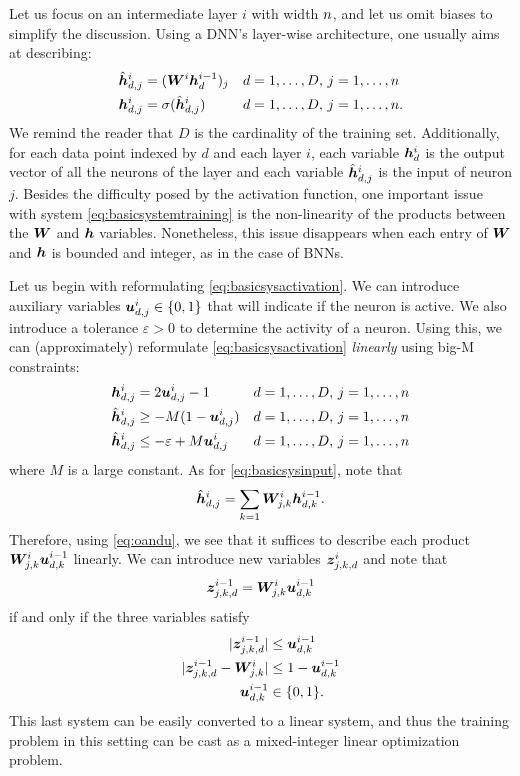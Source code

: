 Let us focus on an intermediate layer $i$ with width $n$, and let us omit biases to simplify the discussion. Using a DNN's layer-wise architecture, one usually aims at describing:
%
\begin{subequations} \label{eq:basicsystemtraining}
\begin{align}
    \hat{{\bm{h}}}^i_{d,j} & = ({\bm{W}}^{i} {\bm{h}}^{i-1}_d)_j  && d=1,\ldots,D,\, j=1,\ldots,n \label{eq:basicsysinput}\\
    {\bm{h}}^{i}_{d,j} & = \sigma(\hat{{\bm{h}}}^i_{d,j}) && d=1,\ldots,D,\, j=1,\ldots,n. \label{eq:basicsysactivation}
\end{align}
\end{subequations}
%
We remind the reader that $D$ is the cardinality of the training set.  Additionally, for each data point indexed by $d$ and each layer $i$, each variable ${\bm{h}}_{d}^{i}$ is the output vector of all the neurons of the layer and each variable $\hat{{\bm{h}}}_{d,j}^i$ is the input of neuron $j$.
%
Besides the difficulty posed by the activation function, one important issue with system \eqref{eq:basicsystemtraining} is the non-linearity of the products between the ${\bm{W}}$ and ${\bm{h}}$ variables. Nonetheless, this issue disappears when each entry of ${\bm{W}}$ and ${\bm{h}}$ is bounded and integer, as in the case of BNNs. 

Let us begin with reformulating \eqref{eq:basicsysactivation}. We can introduce auxiliary variables ${\bm{u}}_{d,j}^i\in \{0,1\}$ that will indicate if the neuron is active. We also introduce a tolerance $\varepsilon > 0$ to determine the activity of a neuron. Using this, we can (approximately) reformulate \eqref{eq:basicsysactivation} \emph{linearly} using big-M constraints:
%
\begin{subequations}\label{eq:activationreform}
\begin{align}
    {\bm{h}}^{i}_{d,j} & = 2{\bm{u}}_{d,j}^i -1     && d=1,\ldots,D,\, j=1,\ldots,n \label{eq:oandu}\\
    \hat{{\bm{h}}}^i_{d,j} & \geq -M (1-{\bm{u}}_{d,j}^i) && d=1,\ldots,D,\, j=1,\ldots,n \\
     \hat{{\bm{h}}}^i_{d,j} & \leq -\varepsilon + M {\bm{u}}_{d,j}^i && d=1,\ldots,D,\, j=1,\ldots,n 
\end{align}
\end{subequations}
%
where $M$ is a large constant. 
%
As for \eqref{eq:basicsysinput}, note that 
%
\[ \hat{{\bm{h}}}^i_{d,j} = \sum_{k=1}{\bm{W}}^{i}_{j,k} {\bm{h}}^{i-1}_{d,k}. \]
%
Therefore, using \eqref{eq:oandu}, we see that it suffices to describe each product ${\bm{W}}_{j,k}^{i}{\bm{u}}_{d,k}^{i-1}$ linearly. We can introduce new variables ${\bm{z}}_{j,k,d}^{i}$ and note that
%
\[{\bm{z}}_{j,k,d}^{i-1}= {\bm{W}}_{j,k}^{i}{\bm{u}}_{d,k}^{i-1}\]
%
if and only if the three variables satisfy
%
\begin{align*}
    | {\bm{z}}_{j,k,d}^{i-1} | & \leq {\bm{u}}_{d,k}^{i-1} \\
    |{\bm{z}}_{j,k,d}^{i-1} - {\bm{W}}_{j,k}^{i}| &  \leq 1- {\bm{u}}_{d,k}^{i-1} \\
    {\bm{u}}_{d,k}^{i-1} & \in \{0,1\}.
\end{align*}
%
This last system can be easily converted to a linear system, and thus the training problem in this setting can be cast as a mixed-integer linear optimization problem.

